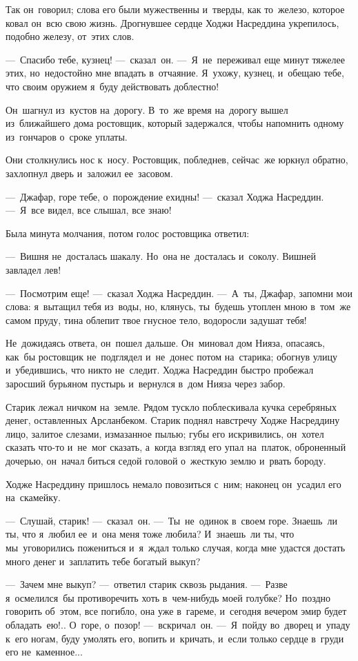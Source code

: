 \documentclass[12pt,a4paper]{book}
\begin{document}
Так он~говорил; слова его были мужественны и~тверды, как то~железо, которое ковал он~всю свою жизнь. Дрогнувшее сердце Ходжи Насреддина укрепилось, подобно железу, от~этих слов.

—~Спасибо тебе, кузнец! —~сказал~он. —~Я~не~переживал еще минут тяжелее этих, но~недостойно мне впадать в~отчаяние. Я~ухожу, кузнец, и~обещаю тебе, что своим оружием я~буду действовать доблестно!

Он~шагнул из~кустов на~дорогу. В~то~же время на~дорогу вышел из~ближайшего дома ростовщик, который задержался, чтобы напомнить одному из~гончаров о~сроке уплаты.

Они столкнулись нос к~носу. Ростовщик, побледнев, сейчас~же юркнул обратно, захлопнул дверь и~заложил ее~засовом.

—~Джафар, горе тебе, о~порождение ехидны! —~сказал Ходжа Насреддин. —~Я~все видел, все слышал, все знаю!

Была минута молчания, потом голос ростовщика ответил:

—~Вишня не~досталась шакалу. Но~она не~досталась и~соколу. Вишней завладел лев!

—~Посмотрим еще! —~сказал Ходжа Насреддин. —~А~ты, Джафар, запомни мои слова: я~вытащил тебя из~воды, но, клянусь, ты~будешь утоплен мною в~том~же самом пруду, тина облепит твое гнусное тело, водоросли задушат тебя!

Не~дожидаясь ответа, он~пошел дальше. Он~миновал дом Нияза, опасаясь, как~бы ростовщик не~подглядел и~не~донес потом на~старика; обогнув улицу и~убедившись, что никто не~следит. Ходжа Насреддин быстро пробежал заросший бурьяном пустырь и~вернулся в~дом Нияза через забор.

Старик лежал ничком на~земле. Рядом тускло поблескивала кучка серебряных денег, оставленных Арсланбеком. Старик поднял навстречу Ходже Насреддину лицо, залитое слезами, измазанное пылью; губы его искривились, он~хотел сказать что-то и~не~мог сказать, а~когда взгляд его упал на~платок, оброненный дочерью, он~начал биться седой головой о~жесткую землю и~рвать бороду.

Ходже Насреддину пришлось немало повозиться с~ним; наконец он~усадил его на~скамейку.

—~Слушай, старик! —~сказал~он. —~Ты~не~одинок в~своем горе. Знаешь~ли ты, что я~любил ее~и~она меня тоже любила? И~знаешь~ли ты, что мы~уговорились пожениться и~я~ждал только случая, когда мне удастся достать много денег и~заплатить тебе богатый выкуп?

—~Зачем мне выкуп? —~ответил старик сквозь рыдания. —~Разве я~осмелился~бы противоречить хоть в~чем-нибудь моей голубке? Но~поздно говорить об~этом, все погибло, она уже в~гареме, и~сегодня вечером эмир будет обладать~ею!.. О~горе, о~позор! —~вскричал~он. —~Я~пойду во~дворец и~упаду к~его ногам, буду умолять его, вопить и~кричать, и~если только сердце в~груди его не~каменное...
\end{document}
